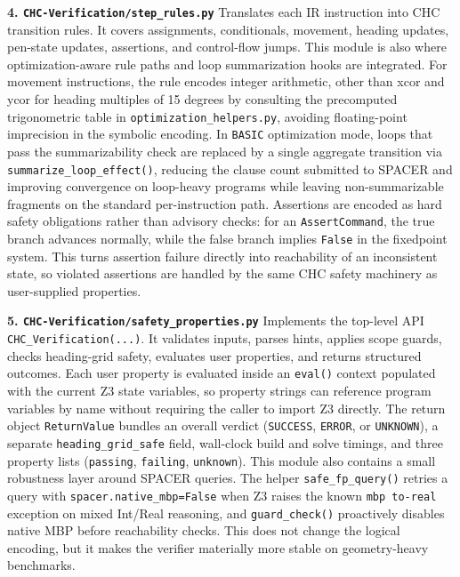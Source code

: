 \textbf{4. \texttt{CHC-Verification/step\_rules.py}}
Translates each IR instruction into CHC transition rules. It covers assignments, conditionals, movement, heading updates, pen-state updates, assertions, and control-flow jumps. This module is also where optimization-aware rule paths and loop summarization hooks are integrated.
For movement instructions, the rule encodes integer arithmetic, other than xcor and ycor for heading multiples of 15 degrees by consulting the precomputed trigonometric table in \texttt{optimization\_helpers.py}, avoiding floating-point imprecision in the symbolic encoding.
In \texttt{BASIC} optimization mode, loops that pass the summarizability check are replaced by a single aggregate transition via \texttt{summarize\_loop\_effect()}, reducing the clause count submitted to SPACER and improving convergence on loop-heavy programs while leaving non-summarizable fragments on the standard per-instruction path.
Assertions are encoded as hard safety obligations rather than advisory checks: for an \texttt{AssertCommand}, the true branch advances normally, while the false branch implies \texttt{False} in the fixedpoint system. This turns assertion failure directly into reachability of an inconsistent state, so violated assertions are handled by the same CHC safety machinery as user-supplied properties.

\textbf{5. \texttt{CHC-Verification/safety\_properties.py}}
Implements the top-level API \texttt{CHC\_Verification(...)}. It validates inputs, parses hints, applies scope guards, checks heading-grid safety, evaluates user properties, and returns structured outcomes.
Each user property is evaluated inside an \texttt{eval()} context populated with the current Z3 state variables, so property strings can reference program variables by name without requiring the caller to import Z3 directly.
The return object \texttt{ReturnValue} bundles an overall verdict (\texttt{SUCCESS}, \texttt{ERROR}, or \texttt{UNKNOWN}), a separate \texttt{heading\_grid\_safe} field, wall-clock build and solve timings, and three property lists (\texttt{passing}, \texttt{failing}, \texttt{unknown}).
This module also contains a small robustness layer around SPACER queries. The helper \texttt{safe\_fp\_query()} retries a query with \texttt{spacer.native\_mbp=False} when Z3 raises the known \texttt{mbp to-real} exception on mixed Int/Real reasoning, and \texttt{guard\_check()} proactively disables native MBP before reachability checks. This does not change the logical encoding, but it makes the verifier materially more stable on geometry-heavy benchmarks.

